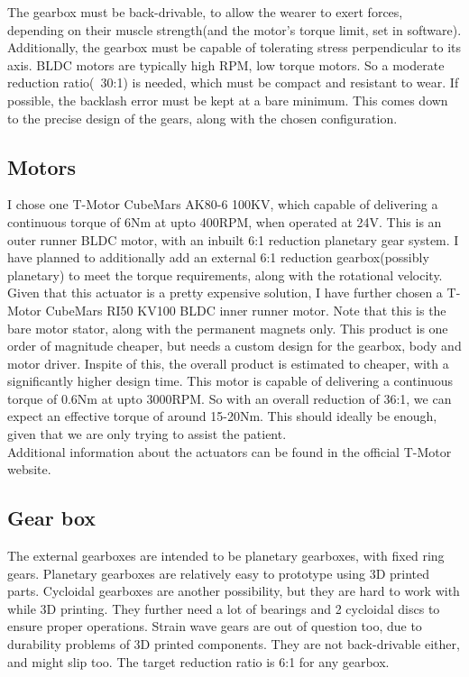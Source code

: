 \documentclass[a4paper]{article}
\begin{document}
		The gearbox must be back-drivable, to allow the wearer to exert forces, depending on their muscle strength(and the motor's torque limit, set in software). Additionally, the gearbox must be capable of tolerating stress perpendicular to its axis. BLDC motors are typically high RPM, low torque motors. So a moderate reduction ratio(~30:1) is needed, which must be compact and resistant to wear. If possible, the backlash error must be kept at a bare minimum. This comes down to the precise design of the gears, along with the chosen configuration.\\

		\subsection{Motors}
			I chose one T-Motor CubeMars AK80-6 100KV, which capable of delivering a continuous torque of 6Nm at upto 400RPM, when operated at 24V. This is an outer runner BLDC motor, with an inbuilt 6:1 reduction planetary gear system. I have planned to additionally add an external 6:1 reduction gearbox(possibly planetary) to meet the torque requirements, along with the rotational velocity.\\

			Given that this actuator is a pretty expensive solution, I have further chosen a T-Motor CubeMars RI50 KV100 BLDC inner runner motor. Note that this is the bare motor stator, along with the permanent magnets only. This product is one order of magnitude cheaper, but needs a custom design for the gearbox, body and motor driver. Inspite of this, the overall product is estimated to cheaper, with a significantly higher design time. This motor is capable of delivering a continuous torque of 0.6Nm at upto 3000RPM. So with an overall reduction of 36:1, we can expect an effective torque of around 15-20Nm. This should ideally be enough, given that we are only trying to assist the patient.\\

			Additional information about the actuators can be found in the official T-Motor website.

		\subsection{Gear box}
			The external gearboxes are intended to be planetary gearboxes, with fixed ring gears. Planetary gearboxes are relatively easy to prototype using 3D printed parts. Cycloidal gearboxes are another possibility, but they are hard to work with while 3D printing. They further need a lot of bearings and 2 cycloidal discs to ensure proper operations. Strain wave gears are out of question too, due to durability problems of 3D printed components. They are not back-drivable either, and might slip too. The target reduction ratio is 6:1 for any gearbox.
\end{document}
